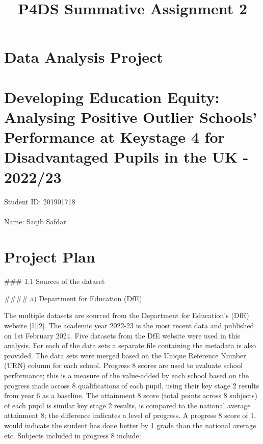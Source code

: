 \documentclass[
  letterpaper,
  DIV=11,
  numbers=noendperiod]{scrartcl}
\title{P4DS Summative Assignment 2}
\author{}
\date{}
\makeatletter
\let\oldparagraph\paragraph
\renewcommand{\paragraph}{
    \@ifstar
      \xxxParagraphStar
      \xxxParagraphNoStar
  }
\newcommand{\xxxParagraphStar}[1]{\oldparagraph*{#1}\mbox{}}
\newcommand{\xxxParagraphNoStar}[1]{\oldparagraph{#1}\mbox{}}
\makeatother
\begin{document}
\maketitle

\section{Data Analysis Project}\label{data-analysis-project}

\section{Developing Education Equity: Analysing Positive Outlier
Schools' Performance at Keystage 4 for Disadvantaged Pupils in the UK -
2022/23}\label{developing-education-equity-analysing-positive-outlier-schools-performance-at-keystage-4-for-disadvantaged-pupils-in-the-uk---202223}

\paragraph{Student ID: 201901718}\label{student-id-201901718}

\paragraph{Name: Saqib Safdar}\label{name-saqib-safdar}

\section{Project Plan}\label{project-plan}

\#\#\# 1.1 Sources of the dataset

\#\#\#\# a) Department for Education (DfE)

The multiple datasets are sourced from the Department for Education's
(DfE) website {[}1{]}{[}2{]}. The academic year 2022-23 is the most
recent data and published on 1st February 2024. Five datasets from the
DfE website were used in this analysis. For each of the data sets a
separate file containing the metadata is also provided. The data sets
were merged based on the Unique Reference Number (URN) column for each
school. Progress 8 scores are used to evaluate school performance; this
is a measure of the value-added by each school based on the progress
made across 8 qualifications of each pupil, using their key stage 2
results from year 6 as a baseline. The attainment 8 score (total points
across 8 subjects) of each pupil is similar key stage 2 results, is
compared to the national average attainment 8; the difference indicates
a level of progress. A progress 8 score of 1, would indicate the student
has done better by 1 grade than the national average etc. Subjects
included in progress 8 include:
\end{document}
